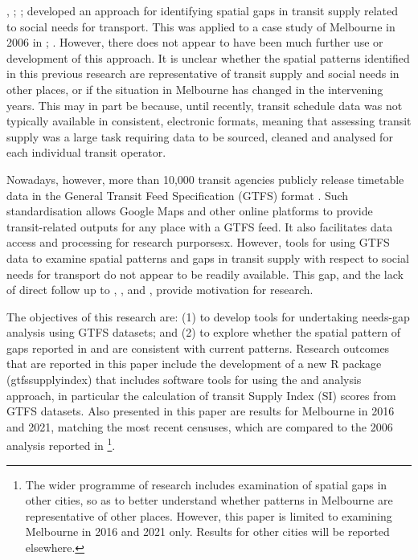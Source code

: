 \documentclass[preprint, 3p,
authoryear]{elsarticle} %
\begin{document}
\citet{Currie2003Hobart}, \citet{Currie2004Gap};
\citet{Currie2007Identifying}; \citet{currie2010identifying} developed
an approach for identifying spatial gaps in transit supply related to
social needs for transport. This was applied to a case study of
Melbourne in 2006 in \citet{Currie2007Identifying};
\citet{currie2010identifying}. However, there does not appear to have
been much further use or development of this approach. It is unclear
whether the spatial patterns identified in this previous research are
representative of transit supply and social needs in other places, or if
the situation in Melbourne has changed in the intervening years. This
may in part be because, until recently, transit schedule data was not
typically available in consistent, electronic formats, meaning that
assessing transit supply was a large task requiring data to be sourced,
cleaned and analysed for each individual transit operator.

Nowadays, however, more than 10,000 transit agencies publicly release
timetable data in the General Transit Feed Specification (GTFS) format
\citep{GTFS}. Such standardisation allows Google Maps and other online
platforms to provide transit-related outputs for any place with a GTFS
feed. It also facilitates data access and processing for research
purporsesx. However, tools for using GTFS data to examine spatial
patterns and gaps in transit supply with respect to social needs for
transport do not appear to be readily available. This gap, and the lack
of direct follow up to \citet{Currie2003Hobart}, \citet{Currie2004Gap},
\citet{Currie2007Identifying} and \citet{currie2010identifying}, provide
motivation for research.

The objectives of this research are: (1) to develop tools for
undertaking needs-gap analysis using GTFS datasets; and (2) to explore
whether the spatial pattern of gaps reported in
\citet{Currie2007Identifying} and \citet{currie2010identifying} are
consistent with current patterns. Research outcomes that are reported in
this paper include the development of a new R package (gtfssupplyindex)
that includes software tools for using the \citet{Currie2007Identifying}
and \citet{currie2010identifying} analysis approach, in particular the
calculation of transit Supply Index (SI) scores from GTFS datasets. Also
presented in this paper are results for Melbourne in 2016 and 2021,
matching the most recent censuses, which are compared to the 2006
analysis reported in \citet{currie2010identifying}\footnote{The wider
  programme of research includes examination of spatial gaps in other
  cities, so as to better understand whether patterns in Melbourne are
  representative of other places. However, this paper is limited to
  examining Melbourne in 2016 and 2021 only. Results for other cities
  will be reported elsewhere.}.
\end{document}
